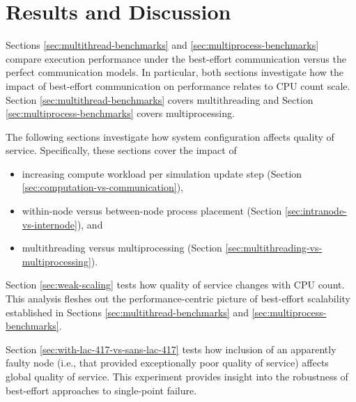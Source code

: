 \section{Results and Discussion}



Sections \ref{sec:multithread-benchmarks} and \ref{sec:multiprocess-benchmarks} compare execution performance under the best-effort communication versus the perfect communication models.
In particular, both sections investigate how the impact of best-effort communication on performance relates to CPU count scale.
Section \ref{sec:multithread-benchmarks} covers multithreading and Section \ref{sec:multiprocess-benchmarks} covers multiprocessing.

The following sections investigate how system configuration affects quality of service.
Specifically, these sections cover the impact of
\begin{itemize}
  \item increasing compute workload per simulation update step (Section \ref{sec:computation-vs-communication}),
  \item within-node versus between-node process placement (Section \ref{sec:intranode-vs-internode}), and
  \item multithreading versus multiprocessing (Section \ref{sec:multithreading-vs-multiprocessing}).
\end{itemize}

Section \ref{sec:weak-scaling} tests how quality of service changes with CPU count.
This analysis fleshes out the performance-centric picture of best-effort scalability established in Sections \ref{sec:multithread-benchmarks} and \ref{sec:multiprocess-benchmarks}.

Section \ref{sec:with-lac-417-vs-sans-lac-417} tests how inclusion of an apparently faulty node (i.e., that provided exceptionally poor quality of service) affects global quality of service.
This experiment provides insight into the robustness of best-effort approaches to single-point failure.














